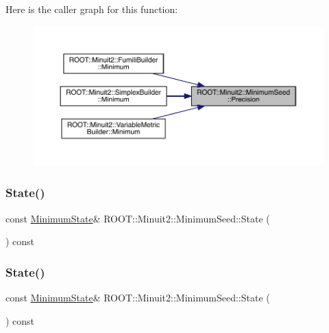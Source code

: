 Here is the caller graph for this function\+:\nopagebreak
\begin{figure}[H]
\begin{center}
\leavevmode
\includegraphics[width=350pt]{d1/d50/classROOT_1_1Minuit2_1_1MinimumSeed_a0cc83616e61f2d3552cedf34ed09e361_icgraph}
\end{center}
\end{figure}
\mbox{\label{classROOT_1_1Minuit2_1_1MinimumSeed_a732476aa579a27366511684213835a2e}} 
\subsubsection{\texorpdfstring{State()}{State()}\hspace{0.1cm}{\footnotesize\ttfamily [1/2]}}
{\footnotesize\ttfamily const \mbox{\hyperlink{classROOT_1_1Minuit2_1_1MinimumState}{Minimum\+State}}\& R\+O\+O\+T\+::\+Minuit2\+::\+Minimum\+Seed\+::\+State (\begin{DoxyParamCaption}{ }\end{DoxyParamCaption}) const\hspace{0.3cm}{\ttfamily [inline]}}

\mbox{\label{classROOT_1_1Minuit2_1_1MinimumSeed_a732476aa579a27366511684213835a2e}} 
\subsubsection{\texorpdfstring{State()}{State()}\hspace{0.1cm}{\footnotesize\ttfamily [2/2]}}
{\footnotesize\ttfamily const \mbox{\hyperlink{classROOT_1_1Minuit2_1_1MinimumState}{Minimum\+State}}\& R\+O\+O\+T\+::\+Minuit2\+::\+Minimum\+Seed\+::\+State (\begin{DoxyParamCaption}{ }\end{DoxyParamCaption}) const\hspace{0.3cm}{\ttfamily [inline]}}


